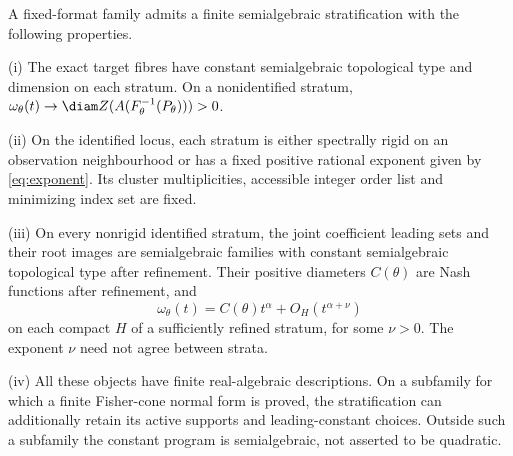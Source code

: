 \begin{theorem}\label{thm:atlas}
A fixed-format family admits a finite semialgebraic stratification with
the following properties.

\smallskip\noindent
\textup{(i)} The exact target fibres have constant semialgebraic
topological type and dimension on each stratum. On a nonidentified
stratum, $\omega_\theta(t)\to\diam Z(A(F_\theta^{-1}(P_\theta)))>0$.

\smallskip\noindent
\textup{(ii)} On the identified locus, each stratum is either spectrally
rigid on an observation neighbourhood or has a fixed positive rational
exponent given by \eqref{eq:exponent}. Its cluster multiplicities,
accessible integer order list and minimizing index set are fixed.

\smallskip\noindent
\textup{(iii)} On every nonrigid identified stratum, the joint coefficient
leading sets and their root images are semialgebraic families with
constant semialgebraic topological type after refinement. Their positive
diameters $C(\theta)$ are Nash functions after refinement, and
\[
 \omega_\theta(t)=C(\theta)t^\alpha+O_H(t^{\alpha+\nu})
\]
on each compact $H$ of a sufficiently refined stratum, for some $\nu>0$.
The exponent $\nu$ need not agree between strata.

\smallskip\noindent
\textup{(iv)} All these objects have finite real-algebraic descriptions.
On a subfamily for which a finite Fisher-cone normal form is proved,
the stratification can additionally retain its active supports and
leading-constant choices. Outside such a subfamily the constant program
is semialgebraic, not asserted to be quadratic.
\end{theorem}
